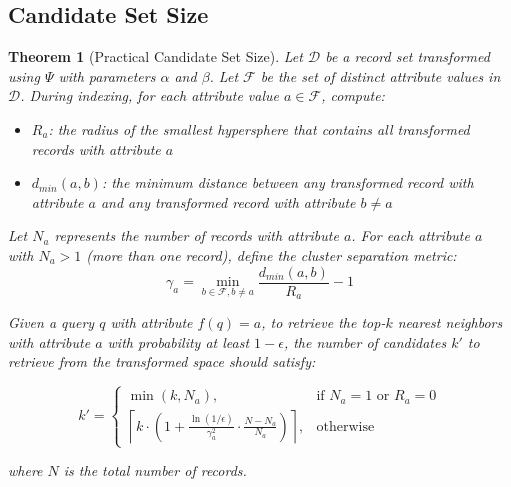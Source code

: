 \documentclass[numbers,sort]{article}
\newtheorem{theorem}{Theorem}
\begin{document}
\subsection{Candidate Set Size}
\begin{theorem}[Practical Candidate Set Size]
\label{theo:k'}
Let $\mathcal{D}$ be a record set transformed using $\Psi$ with parameters $\alpha$ and $\beta$. Let $\mathcal{F}$ be the set of distinct attribute values in $\mathcal{D}$. During indexing, for each attribute value $a \in \mathcal{F}$, compute:

\begin{itemize}
\item $R_a$: the radius of the smallest hypersphere that contains all transformed records with attribute $a$
\item $d_{min}(a, b)$: the minimum distance between any transformed record with attribute $a$ and any transformed record with attribute $b \neq a$
\end{itemize}

Let $N_a$ represents the number of records with attribute $a$. For each attribute $a$ with $N_a > 1$ (more than one record), define the cluster separation metric:
\begin{equation}
\gamma_a = \min_{b \in \mathcal{F}, b \neq a} \frac{d_{min}(a, b)}{R_a} - 1
\end{equation}

Given a query $q$ with attribute $f(q) = a$, to retrieve the top-$k$ nearest neighbors with attribute $a$ with probability at least $1-\epsilon$, the number of candidates $k'$ to retrieve from the transformed space should satisfy:

\begin{equation}
k' =
\begin{cases}
\min(k, N_a), & \text{if } N_a = 1 \text{ or } R_a = 0 \\
\left\lceil k \cdot \left(1 + \frac{\ln(1/\epsilon)}{\gamma_a^2} \cdot \frac{N - N_a}{N_a}\right) \right\rceil, & \text{otherwise}
\end{cases}
\end{equation}

where $N$ is the total number of records.
\end{theorem}
\end{document}
